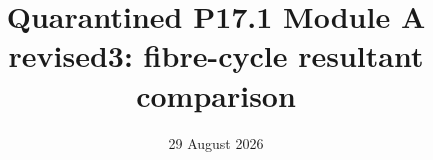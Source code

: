 \documentclass[11pt]{article}
\begin{document}
\title{Quarantined P17.1 Module A revised3: fibre-cycle resultant comparison}
\author{}
\date{29 August 2026}
\maketitle


\end{document}
